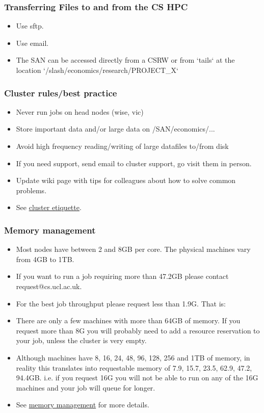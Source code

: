 \documentclass{beamer}
\begin{document}
\begin{frame}
\frametitle{Transferring Files to and from the CS HPC}
\begin{itemize}
\item Use sftp.
\item Use email.
\item The SAN can be accessed directly from a CSRW or from `tails` at the location `/slash/economics/research/PROJECT\_X`
\end{itemize}
\end{frame}

\begin{frame}
\frametitle{Cluster rules/best practice}
\begin{itemize}
\item Never run jobs on head nodes (wise, vic)
\item Store important data and/or large data on /SAN/economics/...
\item Avoid high frequency reading/writing of large datafiles to/from disk
\item If you need support, send email to cluster support, go visit them in person.
\item Update wiki page with tips for colleagues about how to solve common problems.
\item See \textcolor{blue}{ \href{http://hpc.cs.ucl.ac.uk/cluster\_etiquette}{cluster etiquette}}.
\end{itemize}
\end{frame}

\begin{frame}
\frametitle{Memory management}
\begin{itemize}
\item Most nodes have between 2 and 8GB per core.  The physical machines vary from 4GB to 1TB.
\item If you want to run a job requiring more than 47.2GB please contact request@cs.ucl.ac.uk.
\item For the best job throughput please request less than 1.9G. That is:
\item There are only a few machines with more than 64GB of memory. If you request more than 8G you will probably need to add a resource reservation to your job, unless the cluster is very empty.
\item Although machines have 8, 16, 24, 48, 96, 128, 256 and 1TB of memory, in reality this translates into requestable memory of 7.9, 15.7, 23.5, 62.9, 47.2, 94.4GB. i.e. if you request 16G you will not be able to run on any of the 16G machines and your job will queue for longer.
\item See \textcolor{blue}{ \href{http://hpc.cs.ucl.ac.uk/memory\_managment}{memory management}} for more details.
\end{itemize}
\end{frame}
\end{document}
